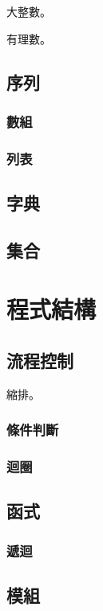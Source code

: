 \documentclass[a4paper,12pt]{book}
\theoremstyle{definition}
\begin{document}
大整數。

有理數。

\chapter{序列}

\section{數組}

\section{列表}

\chapter{字典}

\chapter{集合}

\part{程式結構}

\chapter{流程控制}

縮排。

\section{條件判斷}

\section{迴圈}

\chapter{函式}

\section{遞迴}

\chapter{模組}
\end{document}
